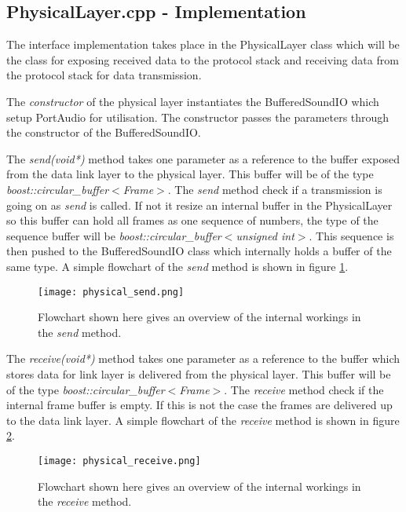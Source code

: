 	\subsection{PhysicalLayer.cpp - Implementation}
	The interface implementation takes place in the PhysicalLayer class which will be the class for exposing received data to the protocol stack
	and receiving data from the protocol stack for data transmission.
	
	The \textit{constructor} of the physical layer instantiates the BufferedSoundIO which setup PortAudio for utilisation. The constructor passes the
	parameters through the constructor of the BufferedSoundIO.
	
	The \textit{send(void*)} method takes one parameter as a reference to the buffer exposed from the data link layer to the physical layer. This buffer
	will be of the type \textit{boost::circular\_buffer$<$Frame$>$}. The \textit{send} method check if a transmission is going on as \textit{send} is called.
	If not it resize an internal buffer in the PhysicalLayer so this buffer can hold all frames as one sequence of numbers, the type of 
	the sequence buffer will be \textit{boost::circular\_buffer$<$unsigned int$>$}. This sequence is then pushed to the BufferedSoundIO class which
	internally holds a buffer of the same type. A simple flowchart of the \textit{send} method is shown in figure \ref{fig:physical_send}.
	
	\begin{figure}[htb]
		\begin{center}
		\texttt{[image: physical\_send.png]}%
		\caption{Flowchart shown here gives an overview of the internal workings in the \textit{send} method.}
		\label{fig:physical_send}
		\end{center}
	\end{figure}
	
	The \textit{receive(void*)} method takes one parameter as a reference to the buffer which stores data for link layer is delivered from the physical layer.
	This buffer	will be of the type \textit{boost::circular\_buffer$<$Frame$>$}. The \textit{receive} method check if the internal frame buffer is empty.
	If this is not the case the frames are delivered up to the data link layer. A simple flowchart of the \textit{receive} method is shown in figure \ref{fig:physical_receive}.
	
	\begin{figure}[htb]
		\begin{center}
		\texttt{[image: physical\_receive.png]}%
		\caption{Flowchart shown here gives an overview of the internal workings in the \textit{receive} method.}
		\label{fig:physical_receive}
		\end{center}
	\end{figure}
	
